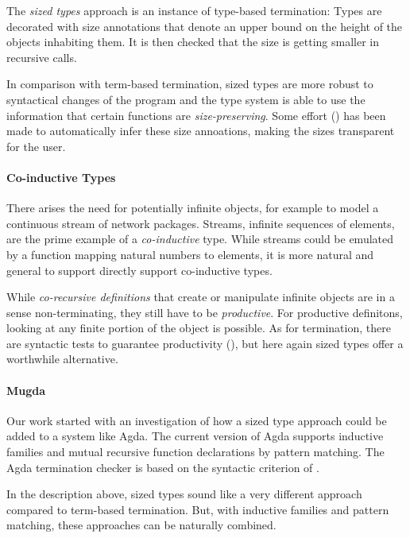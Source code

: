The \emph{sized types} approach is an instance of type-based termination:
Types are decorated with size annotations that denote an upper bound on the height of the objects inhabiting them. 
It is then checked that the size is getting smaller in recursive calls. 

In comparison with term-based termination, sized types are more robust to syntactical changes of the program and the type system is able to use the information that certain functions are \emph{size-preserving}.
Some effort (\cite{bgp:lpar06}) has been made to automatically infer these size annoations, making the sizes transparent for the user. 
\paragraph{Co-inductive Types}
There arises the need for potentially infinite objects, for example to model a continuous stream of network packages.
Streams, infinite sequences of elements, are the prime example of a \emph{co-inductive} type. 
While streams could be emulated by a function mapping natural numbers to elements, it is more 
natural and general to support directly support co-inductive types.

While \emph{co-recursive definitions} that create or manipulate infinite objects are in a sense non-terminating, they still have to be \emph{productive}. For productive definitons, looking at any finite portion of the object is possible.
As for termination, there are syntactic tests to guarantee productivity (\cite{coquand-infinite}), but here again sized types offer a worthwhile alternative.  

\paragraph*{Mugda}
Our work started with an investigation of how a sized type approach could be added to a system like Agda.
The current version of Agda supports inductive families and mutual recursive function declarations by pattern matching. 
The Agda termination checker is based on the syntactic criterion of \cite{abelAltenkirch:predStRec}.

In the description above, sized types sound like a very different approach compared to term-based termination.
But, with inductive families and pattern matching, these approaches can be naturally combined.

